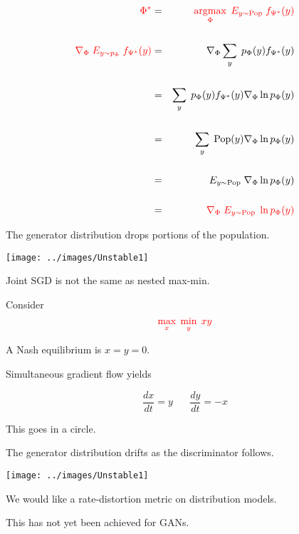 {{

{\huge
\begin{eqnarray*}
 {\color{red} \Phi^*}& = & {\color{red} \operatorname*{argmax}_\Phi\;E_{y \sim \mathrm{Pop}} \;f_{\Psi^*}(y)} \\
 \\
 {\color{red} \nabla_\Phi \; E_{y \sim p_\Phi}\;  f_{\Psi^*}(y)}  & = & \nabla _\Phi \sum_y\; p_\Phi(y) f_{\Psi^*}(y) \\
  \\
  & = & \sum_y \; p_\Phi(y) f_{\Psi^*}(y) \nabla_\Phi \ln p_\Phi(y) \\
  \\
  & = & \sum_y \;\mathrm{Pop}(y) \nabla_\Phi \ln p_\Phi(y) \\
  \\
  & = & E_{y \sim \mathrm{Pop}} \; \nabla_\Phi \ln p_\Phi(y) \\
  \\
  & = & {\color{red} \nabla_\Phi \; E_{y \sim \mathrm{Pop}} \;\ln p_\Phi(y)}
\end{eqnarray*}
}
}



The generator distribution drops portions of the population.

\centerline{\texttt{[image: ../images/Unstable1]}}


Joint SGD is not the same as nested max-min.

\vfill
Consider
$${\color{red} \max_x \; \min_y\; xy}$$

\vfill
A Nash equilibrium is $x= y = 0$.

\vfill
Simultaneous gradient flow yields

{\color{red} $$\frac{dx}{dt}  =  y \;\;\;\;\;\;\frac{dy}{dt} = -x$$}

\vfill
This goes in a circle.


The generator distribution drifts as the discriminator follows.

\centerline{\texttt{[image: ../images/Unstable1]}}


We would like a rate-distortion metric on distribution models.

\vfill
This has not yet been achieved for GANs.

}
